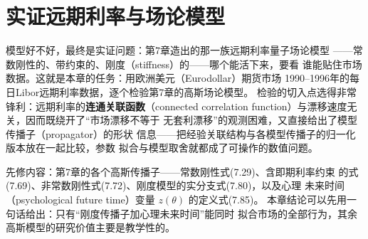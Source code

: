 \chapter{实证远期利率与场论模型}

模型好不好，最终是实证问题：第7章造出的那一族远期利率量子场论模型
——常数刚性的、带约束的、刚度（stiffness）的——哪个能活下来，要看
谁能贴住市场数据。这就是本章的任务：用欧洲美元（Eurodollar）期货市场
1990--1996年的每日Libor远期利率数据，逐个检验第7章的高斯场论模型。
检验的切入点选得非常锋利：远期利率的\textbf{连通关联函数}（connected
correlation function）与漂移速度无关，因而既绕开了“市场漂移不等于
无套利漂移”的观测困难，又直接给出了模型传播子（propagator）的形状
信息——把经验关联结构与各模型传播子的归一化版本放在一起比较，参数
拟合与模型取舍就都成了可操作的数值问题。

先修内容：第7章的各个高斯传播子——常数刚性式(7.29)、含即期利率约束
的式(7.69)、非常数刚性式(7.72)、刚度模型的实分支式(7.80)，以及心理
未来时间（psychological future time）变量 $z(\theta)$ 的定义式(7.85)。
本章结论可以先用一句话给出：只有“刚度传播子加心理未来时间”能同时
拟合市场的全部行为，其余高斯模型的研究价值主要是教学性的。

